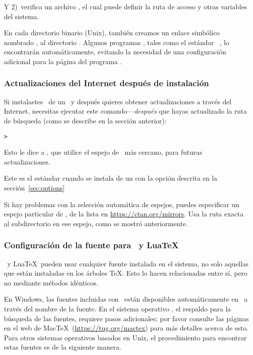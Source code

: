 \documentclass{article}
\begin{document}
Y 2)~verifica un archivo , el cual puede
definir la ruta de acceso y otras variables del sistema.

En cada directorio binario (Unix), también creamos un enlace simbólico
nombrado , al directorio .
Algunos programas , tales como el estándar \MacOSX\
, lo encontrarán automáticamente, evitando la necesidad de
una configuración adicional para la página del programa
.

\subsubsection{Actualizaciones del Internet después de instalación}
\label{sec:dvd-install-net-updates}

Si instalastes \TL\ de un \DVD\ y después quieres obtener
actualizaciones a través del Internet, necesitas ejecutar este
comando---\emph{después} que hayas actualizado la ruta de
búsqueda (como se describe en la sección anterior):

\begin{alltt}
> 
\end{alltt}

Esto le dice a , que utilice el espejo de \CTAN\ más
cercano, para futuras actualizaciones. 

Este es el estándar cuando se instala de un \DVD con la opción
descrita en la sección~\ref{sec:options}

Si hay problemas con la selección automática de espejos, puedes
especificar un espejo particular de \CTAN, de la lista en
\url{https://ctan.org/mirrors}. Usa la ruta exacta al subdirectorio
\dirname{tlnet} en ese espejo, como se mostró anteriormente.

\subsubsection{Configuración de la fuente para \XeTeX\ y Lua\TeX}
\label{sec:font-conf-sys}

\XeTeX\ y Lua\TeX\ pueden usar cualquier fuente instalada en el
sistema, no solo aquellas que están instaladas en los árboles \TeX.
Esto lo hacen relacionadas entre sí, pero no mediante métodos
idénticos. 

En Windows, las fuentes incluidas con \TL\ están disponibles
automáticamente en \XeTeX\ a través del nombre de la fuente. En el
sistema operativo \MacOSX, el respaldo para la búsqueda de las
fuentes, requiere pasos adicionales; por favor consulte las páginas en el web de Mac\TeX\ (\url{https://tug.org/mactex}) para más detalles acerca de esto. Para otros sistemas
operativos basados en Unix, el procedimiento para encontrar estas
fuentes es de la siguiente manera. 
\end{document}
